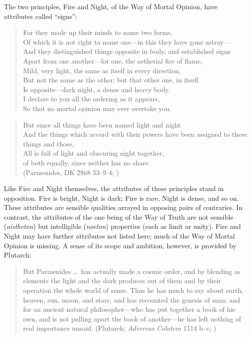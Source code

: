 The two principles, Fire and Night, of the Way of Mortal Opinion, have attributes called ``signs'':
\begin{verse}
    For they made up their minds to name two forms,\\ 
    Of which it is not right to name one---in this they have gone astray---\\
    And they distinguished things opposite in body, and established signs\\
    Apart from one another---for one, the aetherial fire of flame,\\
    Mild, very light, the same as itself in every direction,\\
    But not the same as the other; but that other one, in itself\\
    Is opposite---dark night, a dense and heavy body.\\
    I declare to you all the ordering as it appears,\\
    So that no mortal opinion may ever overtake you.
\end{verse}
\begin{verse}
    But since all things have been named light and night\\
    And the things which accord with their powers have been assigned to these things and those,\\
    All is full of light and obscuring night together,\\
    of both equally, since neither has no share.\\
    (Parmenides, DK 28\textsc{b}8 53--9 4; \citealt[155]{McKirahan:1994ve})
\end{verse}
Like Fire and Night themselves, the attributes of these principles stand in opposition. Fire is bright, Night is dark; Fire is rare, Night is dense, and so on. These attributes are sensible qualities arrayed in opposing pairs of contraries. In contrast, the attributes of the one being of the Way of Truth are not sensible (\emph{aistheton}) but intelligible (\emph{noeton}) properties (such as limit or unity).  Fire and Night may have further attributes not listed here; much of the Way of Mortal Opinion is missing. A sense of its scope and ambition, however, is provided by Plutarch:
\begin{quote}
    But Parmenides \ldots\ has actually made a cosmic order, and by blending as elements the light and the dark produces out of them and by their operation the whole world of sense. Thus he has much to say about earth, heaven, sun, moon, and stars, and has recounted the genesis of man; and for an ancient natural philosopher---who has put together a book of his own, and is not pulling apart the book of another---he has left nothing of real importance unsaid. (Plutarch, \emph{Adversus Colotem} 1114 b--c; \citealt[231]{Einarson:1967zr})
\end{quote}

